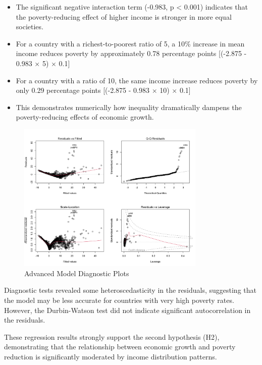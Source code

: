 \documentclass[12pt,a4paper]{article}
\begin{document}
\begin{enumerate}
\begin{itemize}
        \item The significant negative interaction term (-0.983, p < 0.001) indicates that the poverty-reducing effect of higher income is stronger in more equal societies.
        \item For a country with a richest-to-poorest ratio of 5, a 10\% increase in mean income reduces poverty by approximately 0.78 percentage points [(-2.875 - 0.983 $\times$ 5) $\times$ 0.1]
        \item For a country with a ratio of 10, the same income increase reduces poverty by only 0.29 percentage points [(-2.875 - 0.983 $\times$ 10) $\times$ 0.1]
        \item This demonstrates numerically how inequality dramatically dampens the poverty-reducing effects of economic growth.
    \end{itemize}
\end{enumerate}

\begin{figure}[h]
\centering
\includegraphics[width=0.8\textwidth]{../output/visualizations/advanced_model_diagnostics.png}
\caption{Advanced Model Diagnostic Plots}
\end{figure}

Diagnostic tests revealed some heteroscedasticity in the residuals, suggesting that the model may be less accurate for countries with very high poverty rates. However, the Durbin-Watson test did not indicate significant autocorrelation in the residuals.

These regression results strongly support the second hypothesis (H2), demonstrating that the relationship between economic growth and poverty reduction is significantly moderated by income distribution patterns.
\end{document}
